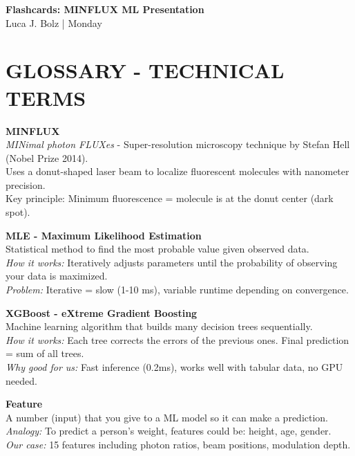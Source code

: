 \documentclass[a4paper,10pt]{article}
\begin{document}
\begin{center}
{\LARGE\bfseries\color{mpigreen} Flashcards: MINFLUX ML Presentation}\\[5pt]
{\large Luca J. Bolz | Monday}
\end{center}

\vspace{0.5cm}

\section*{GLOSSARY - TECHNICAL TERMS}

\begin{mdframed}[style=glossar]
\textbf{MINFLUX}\\[3pt]
\textit{MINimal photon FLUXes} - Super-resolution microscopy technique by Stefan Hell (Nobel Prize 2014).\\
Uses a donut-shaped laser beam to localize fluorescent molecules with nanometer precision.\\
Key principle: Minimum fluorescence = molecule is at the donut center (dark spot).
\end{mdframed}

\begin{mdframed}[style=glossar]
\textbf{MLE - Maximum Likelihood Estimation}\\[3pt]
Statistical method to find the most probable value given observed data.\\
\textit{How it works:} Iteratively adjusts parameters until the probability of observing your data is maximized.\\
\textit{Problem:} Iterative = slow (1-10 ms), variable runtime depending on convergence.
\end{mdframed}

\begin{mdframed}[style=glossar]
\textbf{XGBoost - eXtreme Gradient Boosting}\\[3pt]
Machine learning algorithm that builds many decision trees sequentially.\\
\textit{How it works:} Each tree corrects the errors of the previous ones. Final prediction = sum of all trees.\\
\textit{Why good for us:} Fast inference (0.2ms), works well with tabular data, no GPU needed.
\end{mdframed}

\begin{mdframed}[style=glossar]
\textbf{Feature}\\[3pt]
A number (input) that you give to a ML model so it can make a prediction.\\
\textit{Analogy:} To predict a person's weight, features could be: height, age, gender.\\
\textit{Our case:} 15 features including photon ratios, beam positions, modulation depth.
\end{mdframed}
\end{document}
